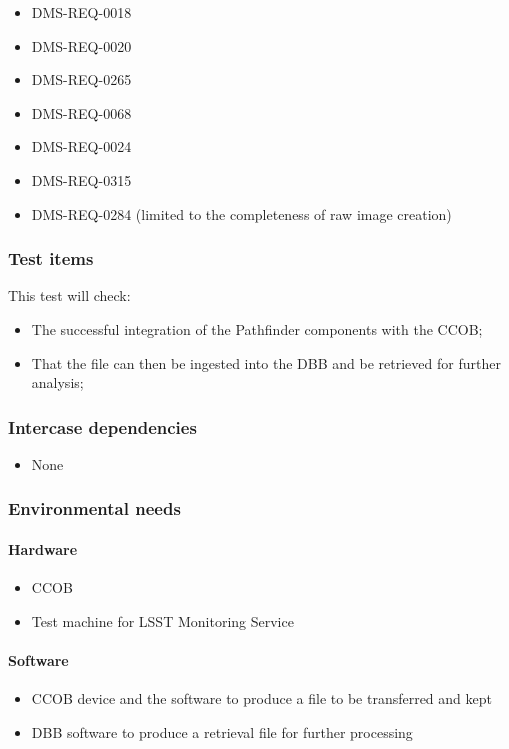 \documentclass[DM,lsstdraft,STS,toc]{lsstdoc}
\begin{document}
\begin{itemize}
\item{DMS-REQ-0018}
\item{DMS-REQ-0020}
\item{DMS-REQ-0265}
\item{DMS-REQ-0068}
\item{DMS-REQ-0024}
\item{DMS-REQ-0315}
\item{DMS-REQ-0284 (limited to the completeness of raw image creation)}
\end{itemize}


\subsubsection{Test items}
This test will check:


\begin{itemize}
\item{The successful integration of the Pathfinder components with the CCOB;}
\item{That the file can then be ingested into the DBB and be retrieved for further analysis;}
\end{itemize}


\subsubsection{Intercase dependencies}
\begin{itemize}
\item{None}
\end{itemize}


\subsubsection{Environmental needs}
\paragraph{Hardware}
\begin{itemize}
\item{CCOB}
\item{Test machine for LSST Monitoring Service}
\end{itemize}


\paragraph{Software}
\begin{itemize}
\item{CCOB device and the software to produce a file to be transferred and kept}
\item{DBB software to produce a retrieval file for further processing}
\end{itemize}
\end{document}
